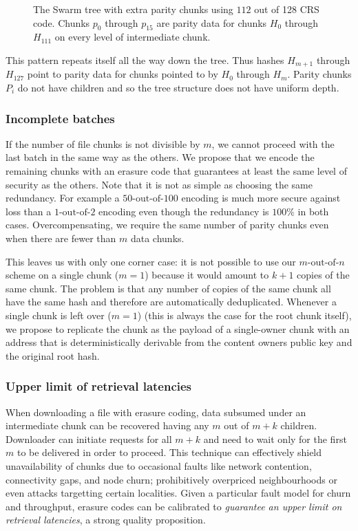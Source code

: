 \begin{figure}[htbp]
   \centering
   \resizebox{1\textwidth}{!}{
        
   }
   \caption[Swarm hash erasure \statusgreen]{The Swarm tree with extra parity chunks using $112$ out of 128 CRS code. Chunks $p_{0}$ through $p_{15}$ are parity data for chunks $H_0 $ through $H_{111}$ on every level of intermediate chunk.}
   \label{fig:Swarm-hash-erasure}
\end{figure}


This pattern repeats itself all the way down the tree. Thus hashes $H_{m+1}$ through $H_{127}$ point to parity data for chunks pointed to by $H_0$ through $H_{m}$. Parity chunks $P_i$ do not have children and so the tree structure does not have uniform depth.

\subsubsection{Incomplete batches}

If the number of file chunks is not divisible by $m$, we cannot proceed with the last batch in the same way as the others. We propose that we encode the remaining chunks with an erasure code that guarantees at least the same level of security as the others. Note that it is not as simple as choosing the same redundancy. For example a $50\text{-out-of-}100$ encoding is much more secure against loss than a $1\text{-out-of-}2$ encoding even though the redundancy is $100\%$ in both cases. Overcompensating, we require the same number of parity chunks even when there are fewer than $m$ data chunks.

This leaves us with only one corner case: it is not possible to use our $m\text{-out-of-}n$ scheme on a single chunk ($m=1$) because it would amount to $k+1$ copies of the same chunk. The problem is that any number of copies of the same chunk all have the same hash and therefore are automatically deduplicated. Whenever a single chunk is left over ($m=1$) (this is always the case for the root chunk itself), we propose to replicate the chunk as the payload of a single-owner chunk with an address that is deterministically derivable from the content owners public key and the original root hash. 

\subsubsection{Upper limit of retrieval latencies}

When downloading a file with erasure coding, data subsumed under an intermediate chunk can be recovered having any $m$ out of $m+k$ children. Downloader can initiate requests for all $m+k$ and need to wait only for the first $m$ to be delivered in order to proceed.  
This technique can effectively shield unavailability of chunks due to occasional faults like network contention, connectivity gaps, and node churn; prohibitively overpriced neighbourhoods or even attacks targetting certain localities. Given a particular fault model for churn and throughput, erasure codes can be calibrated to
\emph{guarantee an upper limit on retrieval latencies}, a strong quality proposition.





